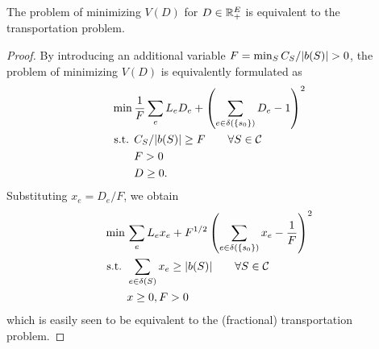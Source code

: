 \documentclass[11pt,a4paper]{article}
\renewcommand{\source}{\ensuremath{s_0}}
\begin{document}
\begin{lemma}\label{lem: minimizing V(D) is the same as transportation problem}
The problem of minimizing $V(D)$ for $D \in \mathbb{R}^E_+$ is equivalent to the
transportation problem. 
\end{lemma}
\begin{proof}
By introducing an additional variable $F = \min_{S} \capa(S)/\abs{b(S)} > 0$, the problem of minimizing $V(D)$ is equivalently formulated as
\begin{align*}
\min\, & \frac{1}{F} \sum_e L_e D_e + \left(\sum_{e \in \delta(\{\source\})} D_e - 1 \right)^2 \\
\text{s.t. } & \capa(S)/\abs{b(S)} \ge F \qquad \forall S \in \calC \\
& F >0 \\
& D \ge 0. 
\end{align*}
Substituting $x_e = D_e / F$, we obtain
\begin{align*}
\min\, & \sum_e L_e x_e  + F^{1/2} \left(\sum_{e \in \delta(\{\source\})} x_e - \frac{1}{F} \right)^2 \\
\text{s.t. } & \sum_{e \in \delta(S)} x_e \ge \abs{b(S)} \qquad \forall S \in \calC \\
& x \ge 0, F > 0
\end{align*}
which is easily seen to be equivalent to the (fractional) transportation problem. 
\end{proof}








\end{document}
